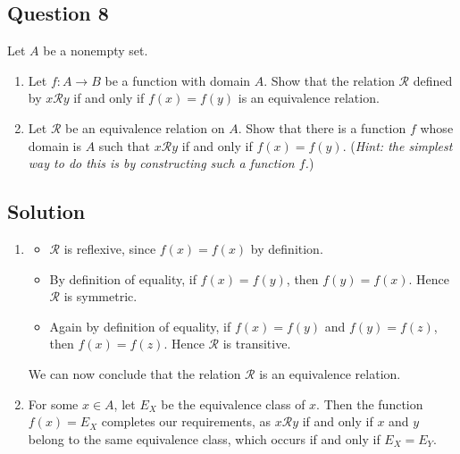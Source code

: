 \documentclass{article}
\begin{document}
\subsection*{Question 8}
    Let $A$ be a nonempty set.
    \begin{enumerate}
        \item Let $f : A \rightarrow B$ be a function with domain $A$. Show that the relation $\mathcal{R}$ defined by $x\mathcal{R}y$ if and only if $f(x) = f(y)$ is an equivalence relation.
        \item Let $\mathcal{R}$ be an equivalence relation on $A$. Show that there is a function $f$ whose domain is $A$ such that $x\mathcal{R}y$ if and only if $f(x) = f(y)$. (\textit{Hint: the simplest way to do this is by constructing such a function $f$.})
    \end{enumerate}

\subsection*{Solution}
    \begin{enumerate}
        \item 
        \begin{itemize}
            \item $\mathcal{R}$ is reflexive, since $f(x) = f(x)$ by definition.
            \item By definition of equality, if $f(x) = f(y)$, then $f(y) = f(x)$. Hence $\mathcal{R}$ is symmetric.
            \item Again by definition of equality, if $f(x) = f(y)$ and $f(y) = f(z)$, then $f(x) = f(z)$. Hence $\mathcal{R}$ is transitive.
        \end{itemize}
        We can now conclude that the relation $\mathcal{R}$ is an equivalence relation.
        \item For some $x \in A$, let $E_{X}$ be the equivalence class of $x$. Then the function $f(x) = E_{X}$ completes our requirements, as $x\mathcal{R}y$ if and only if $x$ and $y$ belong to the same equivalence class, which occurs if and only if $E_{X} = E_{Y}$.
    \end{enumerate}
\end{document}
